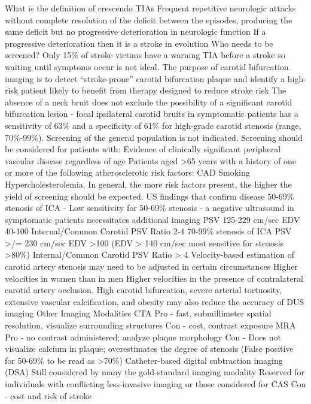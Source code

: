 \documentclass[
]{book}
\theoremstyle{definition}
\theoremstyle{definition}
\theoremstyle{definition}
\theoremstyle{definition}
\theoremstyle{remark}
\begin{document}
What is the definition of crescendo TIAs Frequent repetitive neurologic
attacks without complete resolution of the deficit between the episodes,
producing the same deficit but no progressive deterioration in
neurologic function If a progressive deterioration then it is a stroke
in evolution Who needs to be screened? Only 15\% of stroke victims have a
warning TIA before a stroke so waiting until symptoms occur is not
ideal. The purpose of carotid bifurcation imaging is to detect
``stroke-prone'' carotid bifurcation plaque and identify a high-risk
patient likely to benefit from therapy designed to reduce stroke risk
The absence of a neck bruit does not exclude the possibility of a
significant carotid bifurcation lesion - focal ipsilateral carotid
bruits in symptomatic patients has a sensitivity of 63\% and a
specificity of 61\% for high-grade carotid stenosis (range, 70\%-99\%).
Screening of the general population is not indicated. Screening should
be considered for patients with: Evidence of clinically significant
peripheral vascular disease regardless of age Patients aged \textgreater65 years
with a history of one or more of the following atherosclerotic risk
factors: CAD Smoking Hypercholesterolemia. In general, the more risk
factors present, the higher the yield of screening should be expected.
US findings that confirm disease 50-69\% stenosis of ICA - Low
sensitivity for 50-69\% stenosis - a negative ultrasound in symptomatic
patients necessitates additional imaging PSV 125-229 cm/sec EDV 40-100
Internal/Common Carotid PSV Ratio 2-4 70-99\% stenosis of ICA PSV \textgreater/=
230 cm/sec EDV \textgreater100 (EDV \textgreater{} 140 cm/sec most sensitive for stenosis
\textgreater80\%) Internal/Common Carotid PSV Ratio \textgreater{} 4 Velocity-based estimation
of carotid artery stenosis may need to be adjusted in certain
circumstances Higher velocities in women than in men Higher velocities
in the presence of contralateral carotid artery occlusion. High carotid
bifurcation, severe arterial tortuosity, extensive vascular
calcification, and obesity may also reduce the accuracy of DUS imaging
Other Imaging Modalities CTA Pro - fast, submillimeter spatial
resolution, visualize surrounding structures Con - cost, contrast
exposure MRA Pro - no contrast administered; analyze plaque morphology
Con - Does not visualize calcium in plaque; overestimates the degree of
stenosis (False positive for 50-69\% to be read as \textgreater70\%) Catheter-based
digital subtraction imaging (DSA) Still considered by many the
gold-standard imaging modality Reserved for individuals with conflicting
less-invasive imaging or those considered for CAS Con - cost and risk of
stroke
\end{document}
